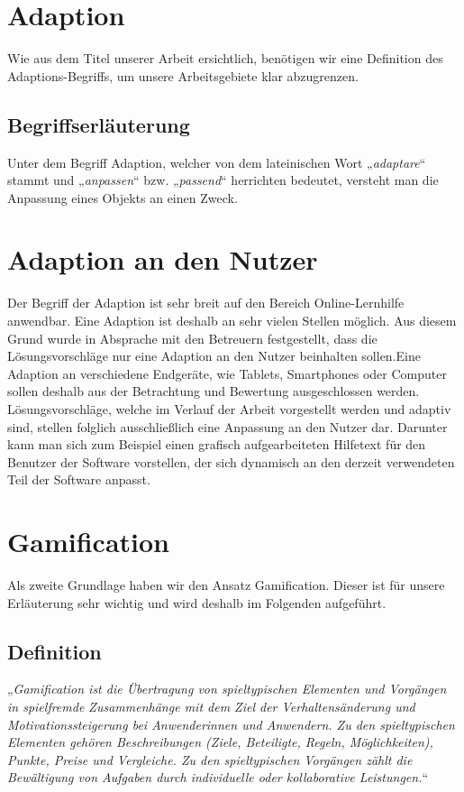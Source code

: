 \section{Adaption}
\label{ch:Content1}
Wie aus dem Titel unserer Arbeit ersichtlich, benötigen wir eine Definition des Adaptions-Begriffs, um unsere Arbeitsgebiete klar abzugrenzen.

\subsection{Begriffserläuterung}
Unter dem Begriff Adaption, welcher von dem lateinischen Wort „\textit{adaptare}“ stammt und „\textit{anpassen}“ bzw. „\textit{passend}“ herrichten \cite{adaptieren} bedeutet, versteht man die Anpassung eines Objekts an einen Zweck. 

\section{Adaption an den Nutzer}
Der Begriff der Adaption ist sehr breit auf den Bereich Online-Lernhilfe anwendbar. Eine Adaption ist deshalb an sehr vielen Stellen möglich. Aus diesem Grund wurde in Absprache mit den Betreuern festgestellt, dass die Lösungsvorschläge nur eine Adaption an den Nutzer beinhalten sollen.Eine Adaption an verschiedene Endgeräte, wie Tablets, Smartphones oder Computer sollen deshalb aus der Betrachtung und Bewertung ausgeschlossen werden. Lösungsvorschläge, welche im Verlauf der Arbeit vorgestellt werden und adaptiv sind, stellen folglich ausschließlich eine Anpassung an den Nutzer dar. Darunter kann man sich zum Beispiel einen grafisch aufgearbeiteten Hilfetext für den Benutzer der Software vorstellen, der sich dynamisch an den derzeit verwendeten Teil der Software anpasst.

\section{Gamification}
Als zweite Grundlage haben wir den Ansatz Gamification. Dieser ist für unsere Erläuterung sehr wichtig und wird deshalb im Folgenden aufgeführt.
\subsection{Definition}
„\textit{Gamification ist die Übertragung von spieltypischen Elementen und Vorgängen in spielfremde Zusammenhänge mit dem Ziel der Verhaltensänderung und Motivationssteigerung bei Anwenderinnen und Anwendern. Zu den spieltypischen Elementen gehören Beschreibungen (Ziele, Beteiligte, Regeln, Möglichkeiten), Punkte, Preise und Vergleiche. Zu den spieltypischen Vorgängen zählt die Bewältigung von Aufgaben durch individuelle oder kollaborative Leistungen.}“ \cite{gamification}

